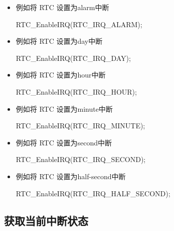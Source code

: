 \documentclass[
  12pt,
]{book}
\newenvironment{Shaded}{\begin{snugshade}}{\end{snugshade}}
\newcommand{\NormalTok}[1]{#1}
\begin{document}
\begin{itemize}
\item
  例如将 RTC 设置为alarm中断

\begin{Shaded}
\begin{Highlighting}[]
\NormalTok{RTC_EnableIRQ(RTC_IRQ_ALARM);}
\end{Highlighting}
\end{Shaded}
\item
  例如将 RTC 设置为day中断

\begin{Shaded}
\begin{Highlighting}[]
\NormalTok{RTC_EnableIRQ(RTC_IRQ_DAY);}
\end{Highlighting}
\end{Shaded}
\item
  例如将 RTC 设置为hour中断

\begin{Shaded}
\begin{Highlighting}[]
\NormalTok{RTC_EnableIRQ(RTC_IRQ_HOUR);}
\end{Highlighting}
\end{Shaded}
\item
  例如将 RTC 设置为minute中断

\begin{Shaded}
\begin{Highlighting}[]
\NormalTok{RTC_EnableIRQ(RTC_IRQ_MINUTE);}
\end{Highlighting}
\end{Shaded}
\item
  例如将 RTC 设置为second中断

\begin{Shaded}
\begin{Highlighting}[]
\NormalTok{RTC_EnableIRQ(RTC_IRQ_SECOND);}
\end{Highlighting}
\end{Shaded}
\item
  例如将 RTC 设置为half-second中断

\begin{Shaded}
\begin{Highlighting}[]
\NormalTok{RTC_EnableIRQ(RTC_IRQ_HALF_SECOND);}
\end{Highlighting}
\end{Shaded}
\end{itemize}

\hypertarget{ux83b7ux53d6ux5f53ux524dux4e2dux65adux72b6ux6001}{%
\subsection{获取当前中断状态}\label{ux83b7ux53d6ux5f53ux524dux4e2dux65adux72b6ux6001}}
\end{document}
